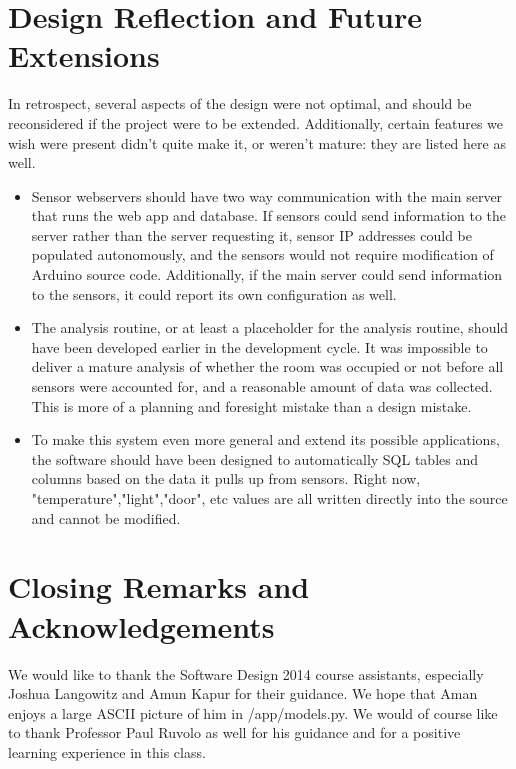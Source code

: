 \documentclass{article}
\begin{document}
\section*{Design Reflection and Future Extensions}
\par In retrospect, several aspects of the design were not optimal, and should be reconsidered if the project were to be extended.  Additionally, certain features we wish were present didn't quite make it, or weren't mature: they are listed here as well.
\begin{itemize}
    \item Sensor webservers should have two way communication with the main server that runs the web app and database. If sensors could send information to the server rather than the server requesting it, sensor IP addresses could be populated autonomously, and the sensors would not require modification of Arduino source code. Additionally, if the main server could send information to the sensors, it could report its own configuration as well.
    \item The analysis routine, or at least a placeholder for the analysis routine, should have been developed earlier in the development cycle. It was impossible to deliver a mature analysis of whether the room was occupied or not before all sensors were accounted for, and a reasonable amount of data was collected. This is more of a planning and foresight mistake than a design mistake.
    \item To make this system even more general and extend its possible applications, the software should have been designed to automatically SQL tables and columns based on the data it pulls up from sensors.  Right now, "temperature","light","door", etc values are all written directly into the source and cannot be modified.
\end{itemize}

\section*{Closing Remarks and Acknowledgements}
We would like to thank the Software Design 2014 course assistants, especially Joshua Langowitz and Amun Kapur for their guidance.  We hope that Aman enjoys a large ASCII picture of him in /app/models.py. We would of course like to thank Professor Paul Ruvolo as well for his guidance and for a positive learning experience in this class.
\end{document}
